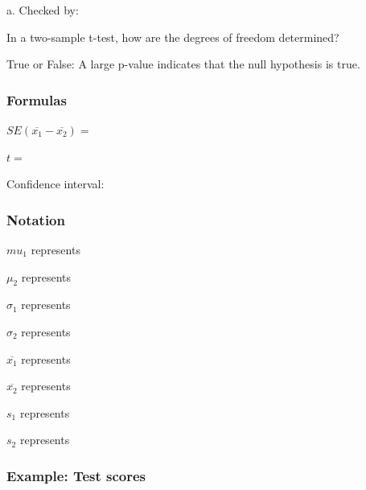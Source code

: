 \documentclass[
]{report}
\newcommand{\rgs}{\vspace{12pt}} %
\newcommand{\rgi}{\hspace{24pt}}  %
\begin{document}
\rgi a. Checked by:
\rgs

In a two-sample t-test, how are the degrees of freedom determined?
\rgs        

True or False: A large p-value indicates that the null hypothesis is true.
\rgs

\hypertarget{formulas-10}{%
\subsubsection*{Formulas}\label{formulas-10}}

\(SE(\overline{x_1} - \overline{x_2})=\)
\rgs

\(t=\)
\rgs

Confidence interval:
\rgs

\hypertarget{notation-3}{%
\subsubsection*{Notation}\label{notation-3}}

\(mu_1\) represents
\rgs

\(\mu_2\) represents
\rgs

\(\sigma_1\) represents
\rgs

\(\sigma_2\) represents
\rgs

\(\overline{x_1}\) represents
\rgs

\(\overline{x_2}\) represents
\rgs

\(s_1\) represents
\rgs

\(s_2\) represents
\rgs

\hypertarget{example-test-scores}{%
\subsubsection*{Example: Test scores}\label{example-test-scores}}
\end{document}
